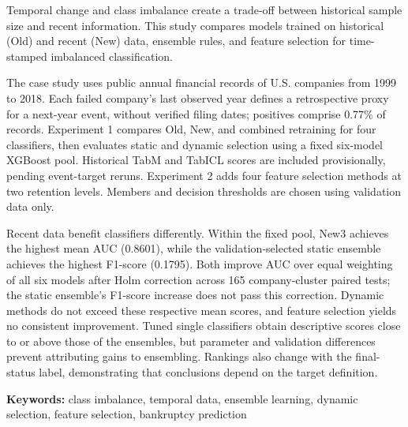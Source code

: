 Temporal change and class imbalance create a trade-off between historical sample size and recent information. This study compares models trained on historical (Old) and recent (New) data, ensemble rules, and feature selection for time-stamped imbalanced classification.

The case study uses public annual financial records of U.S. companies from 1999 to 2018. Each failed company's last observed year defines a retrospective proxy for a next-year event, without verified filing dates; positives comprise 0.77\% of records. Experiment 1 compares Old, New, and combined retraining for four classifiers, then evaluates static and dynamic selection using a fixed six-model XGBoost pool. Historical TabM and TabICL scores are included provisionally, pending event-target reruns. Experiment 2 adds four feature selection methods at two retention levels. Members and decision thresholds are chosen using validation data only.

Recent data benefit classifiers differently. Within the fixed pool, New3 achieves the highest mean AUC (0.8601), while the validation-selected static ensemble achieves the highest F1-score (0.1795). Both improve AUC over equal weighting of all six models after Holm correction across 165 company-cluster paired tests; the static ensemble's F1-score increase does not pass this correction. Dynamic methods do not exceed these respective mean scores, and feature selection yields no consistent improvement. Tuned single classifiers obtain descriptive scores close to or above those of the ensembles, but parameter and validation differences prevent attributing gains to ensembling. Rankings also change with the final-status label, demonstrating that conclusions depend on the target definition.

\noindent\textbf{Keywords:} class imbalance, temporal data, ensemble learning, dynamic selection, feature selection, bankruptcy prediction
